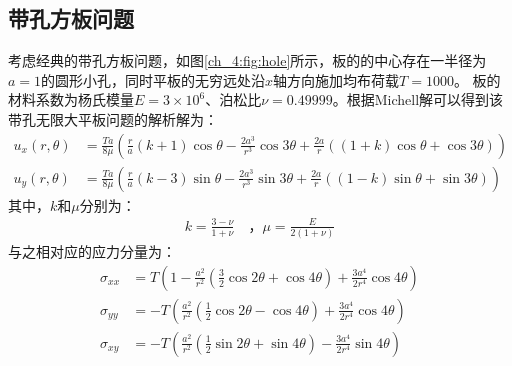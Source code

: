\subsection{带孔方板问题}

考虑经典的带孔方板问题，如图\ref{ch_4:fig:hole}所示，板的的中心存在一半径为$a=1$的圆形小孔，同时平板的无穷远处沿$x$轴方向施加均布荷载$T=1000$。 板的材料系数为杨氏模量$E=3\times10^6$、泊松比$\nu=0.49999$。根据Michell解可以得到该带孔无限大平板问题的解析解为：
\begin{equation}
    \begin{split}
        u_x(r,\theta)&=\frac{Ta}{8\mu}(\frac{r}{a}(k+1)\cos\theta-\frac{2a^3}{r^3}\cos3\theta    +\frac{2a}{r}((1+k)\cos\theta+\cos3\theta))\\
        u_y(r,\theta)&=\frac{Ta}{8\mu}(\frac{r}{a}(k-3)\sin\theta-\frac{2a^3}{r^3}\sin3\theta    +\frac{2a}{r}((1-k)\sin\theta+\sin3\theta))  
    \end{split}
\end{equation}
其中，$k$和$\mu$分别为：
\begin{equation}
    \begin{split}
        k=\frac{3-\nu}{1+\nu}\quad \text{，}\mu=\frac{E}{2(1+\nu)}
    \end{split}
\end{equation}
与之相对应的应力分量为：
\begin{equation}
\begin{split}
    \sigma_{xx}&=T(1-\frac{a^2}{r^2}(\frac{3}{2}\cos2\theta+\cos4\theta)+\frac{3a^4}{2r^4}\cos4\theta)\\
    \sigma_{yy}&=-T(\frac{a^2}{r^2}(\frac{1}{2}\cos2\theta-\cos4\theta)+\frac{3a^4}{2r^4}\cos4\theta)\\
    \sigma_{xy}&=-T(\frac{a^2}{r^2}(\frac{1}{2}\sin2\theta+\sin4\theta)-\frac{3a^4}{2r^4}\sin4\theta)\\
\end{split}
\end{equation}

